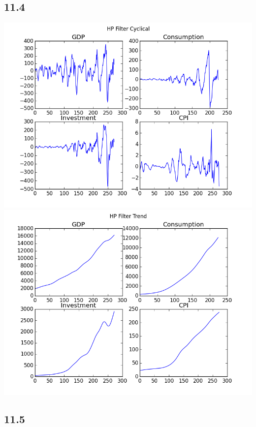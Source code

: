 \documentclass[letterpaper,12pt]{article}
\theoremstyle{definition}
\begin{document}
\subsection*{11.4}


\includegraphics[scale = .75]{elevenfour}\\
\includegraphics[scale = .75]{elvenfourhpfilter}



\subsection*{11.5}
\end{document}
